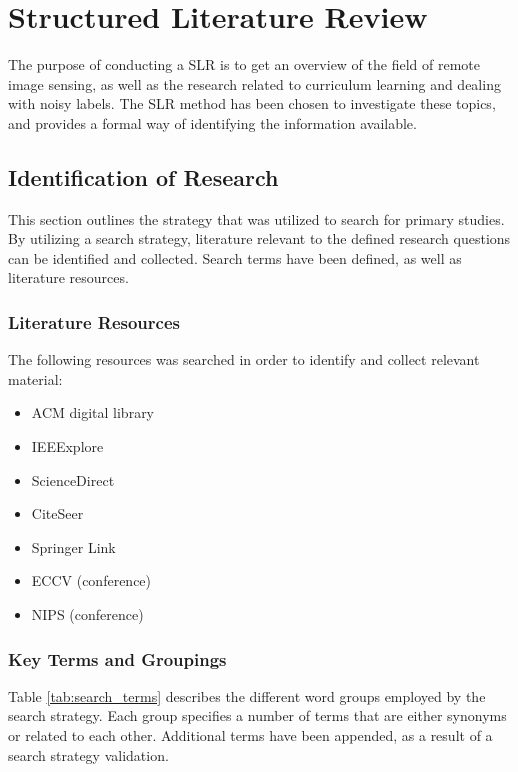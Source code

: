 \section{Structured Literature Review}
The purpose of conducting a \ac{SLR} is to get an overview of the field of remote image sensing, as well as the research related to curriculum learning and dealing with noisy labels. The \ac{SLR} method has been chosen to investigate these topics, and provides a formal way of identifying the information available.

\subsection{Identification of Research}
This section outlines the strategy that was utilized to search for primary studies. By utilizing a search strategy, literature relevant to the defined research questions can be identified and collected. Search terms have been defined, as well as literature resources.

\subsubsection{Literature Resources}
\label{sec:literature_resources}
The following resources was searched in order to identify and collect relevant material:
\begin{itemize}
	\item ACM digital library
	\item IEEExplore
	\item ScienceDirect
	\item CiteSeer
	\item Springer Link
	\item ECCV (conference)
	\item NIPS (conference)
\end{itemize}

\subsubsection{Key Terms and Groupings}
Table \ref{tab:search_terms} describes the different word groups employed by the search strategy. Each group specifies a number of terms that are either synonyms or related to each other. Additional terms have been appended, as a result of a search strategy validation.


